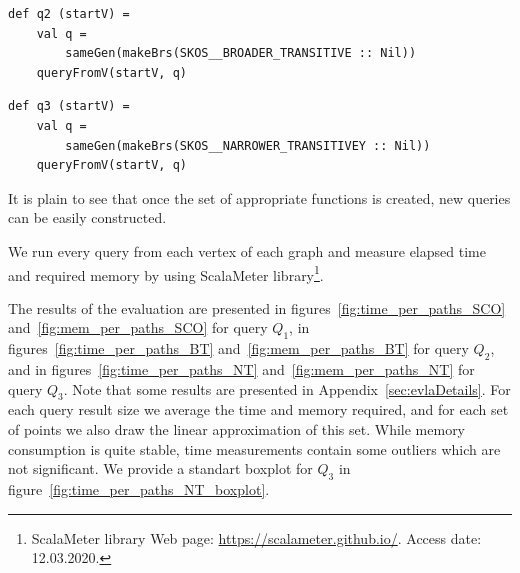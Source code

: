 \begin{lstlisting}
def q2 (startV) =
    val q =
        sameGen(makeBrs(SKOS__BROADER_TRANSITIVE :: Nil))
    queryFromV(startV, q)
\end{lstlisting}

\begin{lstlisting}
def q3 (startV) =
    val q =
        sameGen(makeBrs(SKOS__NARROWER_TRANSITIVEY :: Nil))
    queryFromV(startV, q)
\end{lstlisting}

It is plain to see that once the set of appropriate functions is created, new queries can be easily constructed.

We run every query from each vertex of each graph and measure elapsed time and required memory by using ScalaMeter library\footnote{ScalaMeter library Web page: \url{https://scalameter.github.io/}. Access date: 12.03.2020.}.

The results of the evaluation are presented in figures~\ref{fig:time_per_paths_SCO} and~\ref{fig:mem_per_paths_SCO} for query $Q_1$, in figures~\ref{fig:time_per_paths_BT} and~\ref{fig:mem_per_paths_BT} for query $Q_2$, and in figures~\ref{fig:time_per_paths_NT} and~\ref{fig:mem_per_paths_NT} for query $Q_3$.
Note that some results are presented in Appendix~\ref{sec:evlaDetails}.
For each query result size we average the time and memory required, and for each set of points we also draw the linear approximation of this set.
While memory consumption is quite stable, time measurements contain some outliers which are not significant.
We provide a standart boxplot for $Q_3$ in figure~\ref{fig:time_per_paths_NT_boxplot}.

